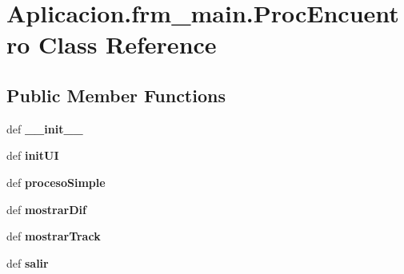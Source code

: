 \section{\-Aplicacion.\-frm\-\_\-main.\-Proc\-Encuentro \-Class \-Reference}
\label{class_aplicacion_1_1frm__main_1_1_proc_encuentro}
\subsection*{\-Public \-Member \-Functions}
\begin{DoxyCompactItemize}
\item 
def {\bf \-\_\-\-\_\-init\-\_\-\-\_\-}
\item 
def {\bf init\-U\-I}
\item 
def {\bf proceso\-Simple}
\item 
def {\bf mostrar\-Dif}
\item 
def {\bf mostrar\-Track}
\item 
def {\bf salir}
\end{DoxyCompactItemize}
